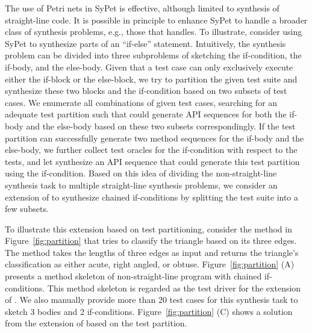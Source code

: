    The use of Petri nets in SyPet is effective, although
limited to synthesis of straight-line code.  It is possible in
principle to enhance SyPet to handle a broader class of synthesis
problems, e.g., those that \tool handles.  To illustrate, consider
using SyPet to synthesize parts of an ``if-else'' statement.  
Intuitively, the synthesis problem can be divided into three
subproblems of sketching the if-condition, the if-body, and the
else-body. Given that a test case can only exclusively execute either
the if-block or the else-block, we try to partition the given test suite
and synthesize these two blocks and the if-condition based on two
subsets of test cases. We enumerate all combinations of given test
cases, searching for an adequate test partition such that \spt could
generate API sequences for both the if-body and the else-body based on
these two subsets correspondingly. If the test partition can
successfully generate two method sequences for the if-body and the
else-body, we further collect test oracles for the if-condition with
respect to the tests, and let \spt synthesize an API sequence that
could generate this test partition using the if-condition. Based on
this idea of dividing the non-straight-line synthesis task to multiple
straight-line synthesis problems, we consider an extension of \spt to
synthesize chained if-conditions by splitting the test suite into a
few subsets.

To illustrate this extension based on test partitioning, consider the
method in Figure~\ref{fig:partition} that tries to classify the
triangle based on its three edges. The method 
takes the lengths of three edges as input and returns the triangle's
classification as either acute, right angled, or obtuse.
Figure~\ref{fig:partition} (A) presents a method skeleton of
non-straight-line program with chained if-conditions. This method
skeleton is regarded as the test driver for the extension of \spt.  We
also manually provide more than 20 test cases for this synthesis task
to sketch 3 bodies and 2 if-conditions. Figure~\ref{fig:partition} (C)
shows a solution from the extension of \spt based on the test
partition.

